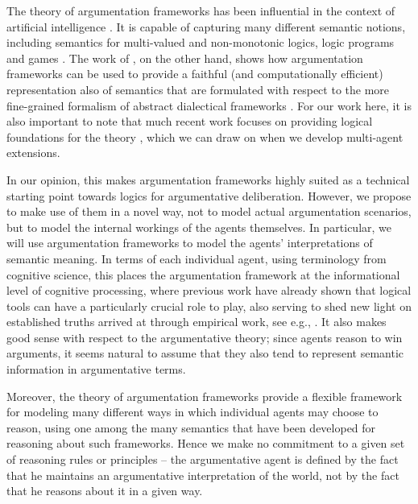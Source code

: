 \documentclass[greybox]{svmult}
\begin{document}
The theory of argumentation frameworks has been influential in the context of artificial intelligence \cite{rahwan}. It is capable of capturing many different semantic notions, including semantics for multi-valued and non-monotonic logics, logic programs and games \cite{dung,dyrkolbotn}. The work of \cite{brewka}, on the other hand, shows how argumentation frameworks can be used to provide a faithful (and computationally efficient) representation also of semantics that are formulated with respect to the more fine-grained formalism of abstract dialectical frameworks \cite{brewka1}. For our work here, it is also important to note that much recent work focuses on providing logical foundations for the theory \cite{grossi,grossi1,arieli,caminada}, which we can draw on when we develop multi-agent extensions.

In our opinion, this makes argumentation frameworks highly suited as a technical starting point towards logics for argumentative deliberation. However, we propose to make use of them in a novel way, not to model actual argumentation scenarios, but to model the internal workings of the agents themselves. In particular, we will use argumentation frameworks to model the agents' interpretations of semantic meaning. In terms of each individual agent, using terminology from cognitive science, this places the argumentation framework at the informational level of cognitive processing, where previous work have already shown that logical tools can have a particularly crucial role to play, also serving to shed new light on established truths arrived at through empirical work, see e.g., \cite{stenning}. It also makes good sense with respect to the argumentative theory; since agents reason to win arguments, it seems natural to assume that they also tend to represent semantic information in argumentative terms.

Moreover, the theory of argumentation frameworks provide a flexible framework for modeling many different ways in which individual agents may choose to reason, using one among the many semantics that have been developed for reasoning about such frameworks. Hence we make no commitment to a given set of reasoning rules or principles -- the argumentative agent is defined by the fact that he maintains an argumentative interpretation of the world, not by the fact that he reasons about it in a given way.
\end{document}
